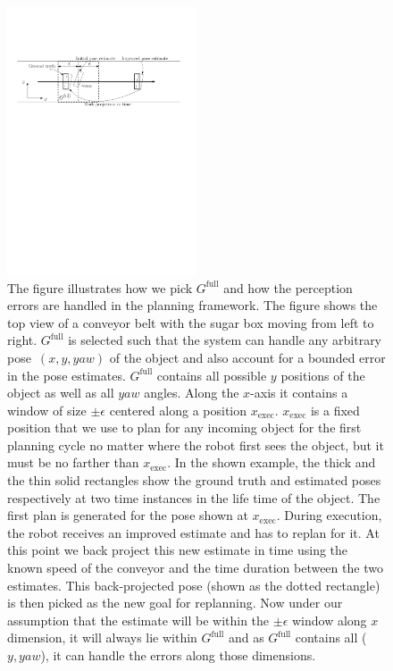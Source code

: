 \begin{figure}
    \centering
    \includegraphics[width=0.5\textwidth]{figs/pose_error.pdf}
    \caption{
    The figure illustrates how we pick $G^{\textrm{full}}$ and how the perception errors are handled in the planning framework. The figure shows the top view of a conveyor belt with the sugar box moving from left to right.
    $G^{\textrm{full}}$ is selected such that the system can handle any arbitrary pose~$(x,y,yaw)$ of the object and also account for a bounded error in the pose estimates.
    $G^{\textrm{full}}$ contains all possible $y$ positions of the object as well as all $yaw$ angles. 
    Along the $x$-axis it contains a window of size $\pm \epsilon$ centered along a position $x_{\textrm{exec}}$.
    $x_{\textrm{exec}}$ is a fixed position that we use to plan for any incoming object for the first planning cycle no matter where the robot first sees the object, but it must be no farther than $x_{\textrm{exec}}$.
    In the shown example, the thick and the thin solid rectangles show the ground truth and estimated poses respectively at two time instances in the life time of the object.
    The first plan is generated for the pose shown at $x_{\textrm{exec}}$. During execution, the robot receives an improved estimate and has to replan for it. At this point we back project this new estimate in time using the known speed of the conveyor and the time duration between the two estimates. This back-projected pose (shown as the dotted rectangle) is then picked as the new goal for replanning. Now under our assumption that the estimate will be within the $\pm \epsilon$ window along $x$ dimension, it will always lie within $G^{\textrm{full}}$ and as $G^{\textrm{full}}$ contains all ($y, yaw$), it can handle the errors along those dimensions.
    }
    \label{fig:pe}
\end{figure}

